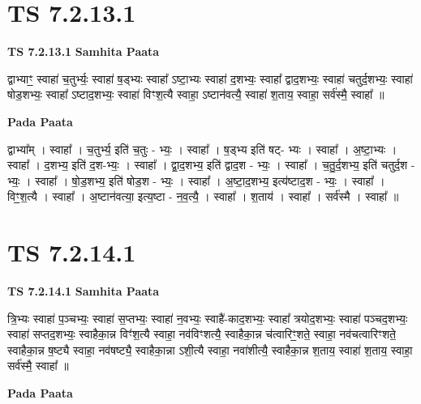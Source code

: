 \documentclass[17pt]{extarticle}
\begin{document}

\section{ TS 7.2.13.1 }

\textbf{TS 7.2.13.1 } \newline
\textbf{Samhita Paata} \newline

द्वाभ्याꣳ॒॒ स्वाहा॑ च॒तुर्भ्यः॒ स्वाहा॑ ष॒ड्भ्यः स्वाहा᳚ ऽष्टा॒भ्यः स्वाहा॑ द॒शभ्यः॒ स्वाहा᳚ द्वाद॒शभ्यः॒ स्वाहा॑ चतुर्द॒शभ्यः॒ स्वाहा॑ षोड॒शभ्यः॒ स्वाहा᳚ ऽष्टाद॒शभ्यः॒ स्वाहा॑ विꣳश॒त्यै स्वाहा॒ ऽष्टान॑वत्यै॒ स्वाहा॑ श॒ताय॒ स्वाहा॒ सर्व॑स्मै॒ स्वाहा᳚ ॥ \newline

\textbf{Pada Paata} \newline

द्वाभ्या᳚म् । स्वाहा᳚ । च॒तुर्भ्य॒ इति॑ च॒तुः - भ्यः॒ । स्वाहा᳚ । ष॒ड्भ्य इति॑ षट्- भ्यः । स्वाहा᳚ । अ॒ष्टा॒भ्यः । स्वाहा᳚ । द॒शभ्य॒ इति॑ द॒श-भ्यः॒ । स्वाहा᳚ । द्वा॒द॒शभ्य॒ इति॑ द्वाद॒श - भ्यः॒ । स्वाहा᳚ । च॒तु॒र्द॒शभ्य॒ इति॑ चतुर्द॒श - भ्यः॒ । स्वाहा᳚ । षो॒ड॒शभ्य॒ इति॑ षोड॒श - भ्यः॒ । स्वाहा᳚ । अ॒ष्टा॒द॒शभ्य॒ इत्य॑ष्टाद॒श - भ्यः॒ । स्वाहा᳚ । विꣳ॒॒श॒त्यै । स्वाहा᳚ । अ॒ष्टान॑वत्या॒ इत्य॒ष्टा - न॒व॒त्यै॒ । स्वाहा᳚ । श॒ताय॑ । स्वाहा᳚ । सर्व॑स्मै । स्वाहा᳚ ॥  \newline





\section{ TS 7.2.14.1 }

\textbf{TS 7.2.14.1 } \newline
\textbf{Samhita Paata} \newline

त्रि॒भ्यः स्वाहा॑ प॒ञ्चभ्यः॒ स्वाहा॑ स॒प्तभ्यः॒ स्वाहा॑ न॒वभ्यः॒ स्वाहै॑-काद॒शभ्यः॒ स्वाहा᳚ त्रयोद॒शभ्यः॒ स्वाहा॑ पञ्चद॒शभ्यः॒ स्वाहा॑ सप्तद॒शभ्यः॒ स्वाहैका॒न्न विꣳ॑श॒त्यै स्वाहा॒ नव॑विꣳशत्यै॒ स्वाहैका॒न्न च॑त्वारिꣳ॒॒शते॒ स्वाहा॒ नव॑चत्वारिꣳशते॒ स्वाहैका॒न्न ष॒ष्ट्यै स्वाहा॒ नव॑षष्ट्यै॒ स्वाहैका॒न्ना ऽशी॒त्यै स्वाहा॒ नवा॑शीत्यै॒ स्वाहैका॒न्न श॒ताय॒ स्वाहा॑ श॒ताय॒ स्वाहा॒ सर्व॑स्मै॒ स्वाहा᳚ ॥ \newline

\textbf{Pada Paata} \newline
\end{document}

